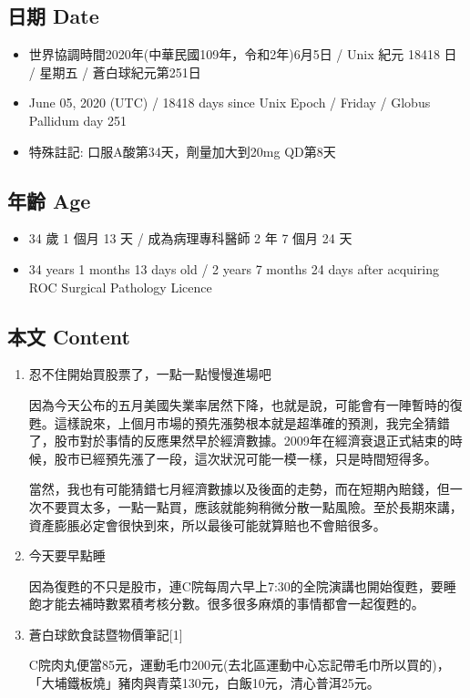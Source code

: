 \documentclass[a5paper, 11pt
]{book}
\providecommand{\tightlist}{%
  \setlength{\itemsep}{0pt}\setlength{\parskip}{0pt}}
\begin{document}
\hypertarget{ux65e5ux671f-date-4}{%
\subsection{日期 Date}\label{ux65e5ux671f-date-4}}

\begin{itemize}
\tightlist
\item
  世界協調時間2020年(中華民國109年，令和2年)6月5日 / Unix 紀元 18418 日
  / 星期五 / 蒼白球紀元第251日
\item
  June 05, 2020 (UTC) / 18418 days since Unix Epoch / Friday / Globus
  Pallidum day 251
\item
  特殊註記: 口服A酸第34天，劑量加大到20mg QD第8天
\end{itemize}

\hypertarget{ux5e74ux9f61-age-4}{%
\subsection{年齡 Age}\label{ux5e74ux9f61-age-4}}

\begin{itemize}
\tightlist
\item
  34 歲 1 個月 13 天 / 成為病理專科醫師 2 年 7 個月 24 天
\item
  34 years 1 months 13 days old / 2 years 7 months 24 days after
  acquiring ROC Surgical Pathology Licence
\end{itemize}

\hypertarget{ux672cux6587-content-4}{%
\subsection{本文 Content}\label{ux672cux6587-content-4}}

\begin{enumerate}
\def\labelenumi{\arabic{enumi}.}
\item
  忍不住開始買股票了，一點一點慢慢進場吧

  因為今天公布的五月美國失業率居然下降，也就是說，可能會有一陣暫時的復甦。這樣說來，上個月市場的預先漲勢根本就是超準確的預測，我完全猜錯了，股市對於事情的反應果然早於經濟數據。2009年在經濟衰退正式結束的時候，股市已經預先漲了一段，這次狀況可能一模一樣，只是時間短得多。

  當然，我也有可能猜錯七月經濟數據以及後面的走勢，而在短期內賠錢，但一次不要買太多，一點一點買，應該就能夠稍微分散一點風險。至於長期來講，資產膨脹必定會很快到來，所以最後可能就算賠也不會賠很多。
\item
  今天要早點睡

  因為復甦的不只是股市，連C院每周六早上7:30的全院演講也開始復甦，要睡飽才能去補時數累積考核分數。很多很多麻煩的事情都會一起復甦的。
\item
  蒼白球飲食誌暨物價筆記{[}1{]}

  C院肉丸便當85元，運動毛巾200元(去北區運動中心忘記帶毛巾所以買的)，「大埔鐵板燒」豬肉與青菜130元，白飯10元，清心普洱25元。
\end{enumerate}
\end{document}
